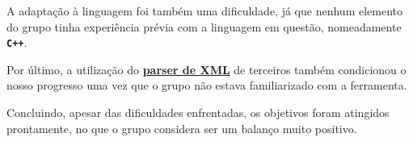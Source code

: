 \documentclass[11pt,a4paper]{report}
\begin{document}
A adaptação à linguagem foi também uma dificuldade, já que nenhum elemento do grupo tinha experiência prévia com a linguagem em questão, nomeadamente \texttt{\textbf{C++}}. 

Por último, a utilização do \href{http://www.grinninglizard.com/tinyxml/}{\textbf{parser de XML}} de terceiros também condicionou o nosso progresso uma vez que o grupo não estava familiarizado com a ferramenta.

Concluindo, apesar das dificuldades enfrentadas, os objetivos foram atingidos prontamente, no que o grupo considera ser um balanço muito positivo.
\end{document}
